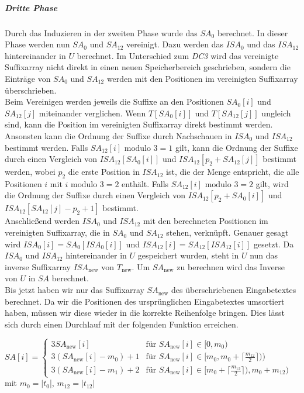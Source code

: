 \subparagraph*{Dritte Phase}

Durch das Induzieren in der zweiten Phase wurde das $SA_0$ berechnet. In dieser Phase werden nun $SA_0$ und $SA_{12}$ vereinigt. Dazu werden das $ISA_0$ und das $ISA_{12}$ hintereinander in $U$ berechnet. Im Unterschied zum \emph{DC3} wird das vereinigte Suffixarray nicht direkt in einen neuen Speicherbereich geschrieben, sondern die Einträge von $SA_0$ und $SA_{12}$ werden mit den Positionen im vereinigten Suffixarray überschrieben. \\
Beim Vereinigen werden jeweils die Suffixe an den Positionen $SA_0[i]$ und $SA_{12}[j]$ miteinander verglichen. Wenn $T[SA_0[i]]$ und $T[SA_{12}[j]]$ ungleich sind, kann die Position im vereinigten Suffixarray direkt bestimmt werden. Ansonsten kann die Ordnung der Suffixe durch Nachschauen in $ISA_0$ und $ISA_{12}$ bestimmt werden. Falls $SA_{12}[i] \text{ modulo } 3 = 1$ gilt, kann die Ordnung der Suffixe durch einen Vergleich von $ISA_{12}[SA_0[i]]$ und $ISA_{12}[p_2+SA_{12}[j]]$ bestimmt werden, wobei $p_2$ die erste Position in $ISA_{12}$ ist, die der Menge entspricht, die alle Positionen $i$ mit $i \text{ modulo } 3 = 2$ enthält. Falls $SA_{12}[i] \text{ modulo } 3 = 2$ gilt, wird die Ordnung der Suffixe durch einen Vergleich von $ISA_{12}[p_2+SA_0[i]]$ und $ISA_{12}[SA_{12}[j]-p_2+1]$ bestimmt. \\
Anschließend werden $ISA_0$ und $ISA_{12}$ mit den berechneten Positionen im vereinigten Suffixarray, die in $SA_0$ und $SA_{12}$ stehen, verknüpft. Genauer gesagt wird $ISA_0[i] = SA_0[ISA_0[i]]$ und $ISA_{12}[i] = SA_{12}[ISA_{12}[i]]$ gesetzt. Da $ISA_0$ und $ISA_{12}$ hintereinander in $U$ gespeichert wurden, steht in $U$ nun das inverse Suffixarray $ISA_{\text{new}}$ von $T_{\text{new}}$. Um $SA_{\text{new}}$ zu berechnen wird das Inverse von $U$ in $SA$ berechnet. \\
Bis jetzt haben wir nur das Suffixarray $SA_{\text{new}}$ des überschriebenen Eingabetextes berechnet. Da wir die Positionen des ursprünglichen Eingabetextes umsortiert haben, müssen wir diese wieder in die korrekte Reihenfolge bringen. Dies lässt sich durch einen Durchlauf mit der folgenden Funktion erreichen. \\
\begin{center}
	$SA[i] =
   \begin{cases}
     3SA_{\text{new}}[i] & \text{für } SA_{\text{new}}[i] \in[0, m_0) \\
     3(SA_{\text{new}}[i]-m_0)+1 & \text{für } SA_{\text{new}}[i] \in [m_0 ,m_0+\lceil \frac{m_{12}}{2} \rceil)) \\
     3(SA_{\text{new}}[i]-m_1)+2 & \text{für } SA_{\text{new}}[i] \in [m_0+\lceil \frac{m_{12}}{2} \rceil),m_0+m_{12})
   \end{cases}$ mit $m_0 = |t_0$|, $m_{12} = |t_{12}|$
\end{center}